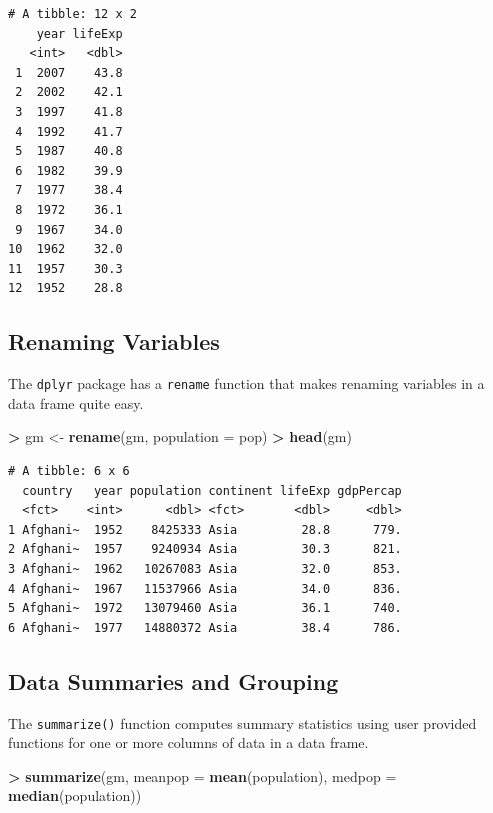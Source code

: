 \documentclass[
]{krantz}
\makeatletter
\newenvironment{Shaded}{\begin{snugshade}}{\end{snugshade}}
\newcommand{\DataTypeTok}[1]{\textcolor[rgb]{0.27,0.27,0.27}{#1}}
\newcommand{\KeywordTok}[1]{\textcolor[rgb]{0.27,0.27,0.27}{\textbf{#1}}}
\newcommand{\NormalTok}[1]{#1}
\newcommand{\OperatorTok}[1]{\textcolor[rgb]{0.43,0.43,0.43}{\textbf{#1}}}
\newcommand{\StringTok}[1]{\textcolor[rgb]{0.5,0.5,0.5}{#1}}
\newenvironment{kframe}{%
\medskip{}
\setlength{\fboxsep}{.8em}
 \def\at@end@of@kframe{}%
 \ifinner\ifhmode%
  \def\at@end@of@kframe{\end{minipage}}%
  \begin{minipage}{\columnwidth}%
 \fi\fi%
 \def\FrameCommand##1{\hskip\@totalleftmargin \hskip-\fboxsep
 \colorbox{shadecolor}{##1}\hskip-\fboxsep
     \hskip-\linewidth \hskip-\@totalleftmargin \hskip\columnwidth}%
 \MakeFramed {\advance\hsize-\width
   \@totalleftmargin\z@ \linewidth\hsize
   \@setminipage}}%
 {\par\unskip\endMakeFramed%
 \at@end@of@kframe}
\renewenvironment{Shaded}{\begin{kframe}}{\end{kframe}}
\makeatother
\begin{document}
\begin{verbatim}
# A tibble: 12 x 2
    year lifeExp
   <int>   <dbl>
 1  2007    43.8
 2  2002    42.1
 3  1997    41.8
 4  1992    41.7
 5  1987    40.8
 6  1982    39.9
 7  1977    38.4
 8  1972    36.1
 9  1967    34.0
10  1962    32.0
11  1957    30.3
12  1952    28.8
\end{verbatim}

\hypertarget{renaming-variables}{%
\subsection{Renaming Variables}\label{renaming-variables}}

The \texttt{dplyr} package has a \texttt{rename} function that makes renaming variables in a data frame quite easy.

\begin{Shaded}
\begin{Highlighting}[]
\OperatorTok{\textgreater{}}\StringTok{ }\NormalTok{gm \textless{}{-}}\StringTok{ }\KeywordTok{rename}\NormalTok{(gm, }\DataTypeTok{population =}\NormalTok{ pop)}
\OperatorTok{\textgreater{}}\StringTok{ }\KeywordTok{head}\NormalTok{(gm)}
\end{Highlighting}
\end{Shaded}

\begin{verbatim}
# A tibble: 6 x 6
  country   year population continent lifeExp gdpPercap
  <fct>    <int>      <dbl> <fct>       <dbl>     <dbl>
1 Afghani~  1952    8425333 Asia         28.8      779.
2 Afghani~  1957    9240934 Asia         30.3      821.
3 Afghani~  1962   10267083 Asia         32.0      853.
4 Afghani~  1967   11537966 Asia         34.0      836.
5 Afghani~  1972   13079460 Asia         36.1      740.
6 Afghani~  1977   14880372 Asia         38.4      786.
\end{verbatim}

\hypertarget{data-summaries-and-grouping}{%
\subsection{Data Summaries and Grouping}\label{data-summaries-and-grouping}}

The \texttt{summarize()} function computes summary statistics using user provided functions for one or more columns of data in a data frame.

\begin{Shaded}
\begin{Highlighting}[]
\OperatorTok{\textgreater{}}\StringTok{ }\KeywordTok{summarize}\NormalTok{(gm, }\DataTypeTok{meanpop =} \KeywordTok{mean}\NormalTok{(population), }\DataTypeTok{medpop =} \KeywordTok{median}\NormalTok{(population))}
\end{Highlighting}
\end{Shaded}
\end{document}
